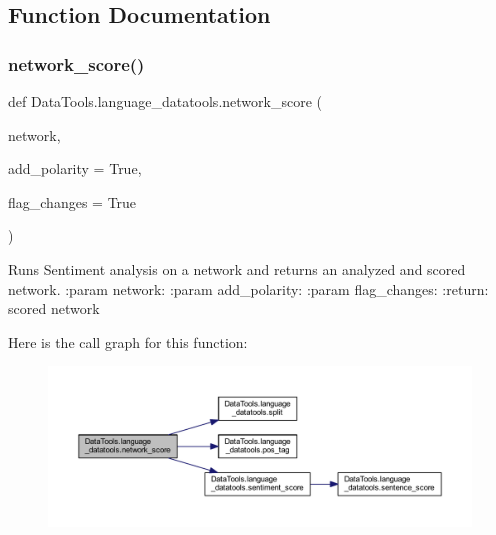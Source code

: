 \subsection{Function Documentation}
\mbox{\label{namespace_data_tools_1_1language__datatools_a5e5c053b4f7d96f05116951b03a214e0}} 
\subsubsection{\texorpdfstring{network\+\_\+score()}{network\_score()}}
{\footnotesize\ttfamily def Data\+Tools.\+language\+\_\+datatools.\+network\+\_\+score (\begin{DoxyParamCaption}\item[{}]{network,  }\item[{}]{add\+\_\+polarity = {\ttfamily True},  }\item[{}]{flag\+\_\+changes = {\ttfamily True} }\end{DoxyParamCaption})}

\begin{DoxyVerb}Runs Sentiment analysis on a network and returns an analyzed and scored network.
:param network:
:param add_polarity:
:param flag_changes:
:return: scored network
\end{DoxyVerb}
 Here is the call graph for this function\+:
\nopagebreak
\begin{figure}[H]
\begin{center}
\leavevmode
\includegraphics[width=350pt]{namespace_data_tools_1_1language__datatools_a5e5c053b4f7d96f05116951b03a214e0_cgraph}
\end{center}
\end{figure}
\mbox{\label{namespace_data_tools_1_1language__datatools_a32400bed4e58a49b11ac2d4e6a2e5462}} 
